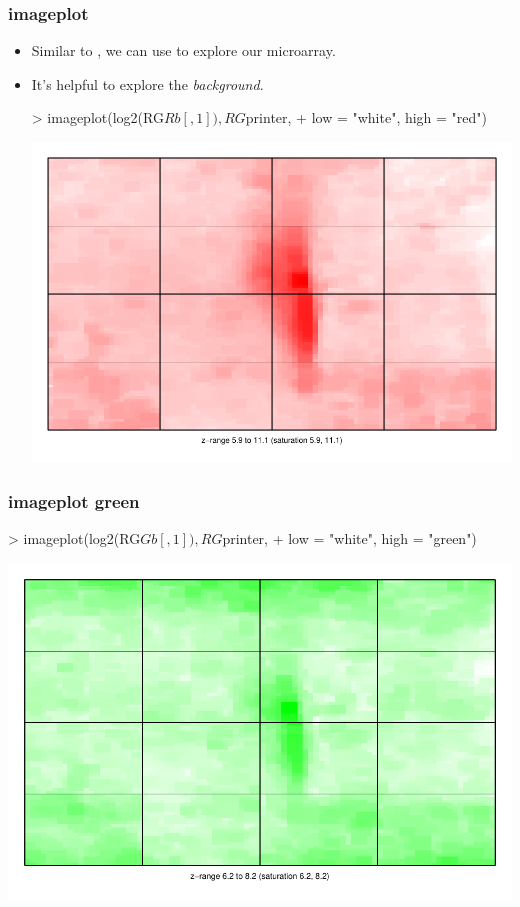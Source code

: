 \begin{frame}
  \frametitle{imageplot}
  \begin{itemize}
  \item Similar to , we can use  to explore our microarray.
  \item It's helpful to explore the \emph{background}.
\begin{Schunk}
\begin{Sinput}
> imageplot(log2(RG$Rb[, 1]), RG$printer, 
+     low = "white", high = "red")
\end{Sinput}
\end{Schunk}
\includegraphics{plots/fig-019}
  \end{itemize}
\end{frame}

\begin{frame}
  \frametitle{imageplot green}
\begin{Schunk}
\begin{Sinput}
> imageplot(log2(RG$Gb[, 1]), RG$printer, 
+     low = "white", high = "green")
\end{Sinput}
\end{Schunk}
\includegraphics{plots/fig-020}
\end{frame}

